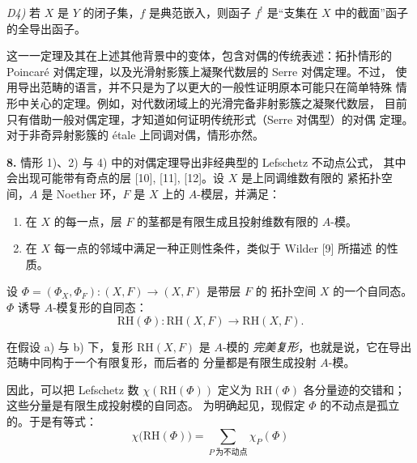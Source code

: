\clearpage
{}
\noindent\textit{D4)} 若 $X$ 是 $Y$ 的闭子集，$f$ 是典范嵌入，则函子
$f^!$ 是“支集在 $X$ 中的截面”函子的全导出函子。

这一一定理及其在上述其他背景中的变体，包含对偶的传统表述：拓扑情形的
Poincaré 对偶定理，以及光滑射影簇上凝聚代数层的 Serre 对偶定理。不过，
使用导出范畴的语言，并不只是为了以更大的一般性证明原本可能只在简单特殊
情形中关心的定理。例如，对代数闭域上的光滑完备非射影簇之凝聚代数层，
目前只有借助一般对偶定理，才知道如何证明传统形式（Serre 对偶型）的对偶
定理。对于非奇异射影簇的 étale 上同调对偶，情形亦然。

\noindent\textbf{8.}\quad
情形 1)、2) 与 4) 中的对偶定理导出非经典型的 Lefschetz 不动点公式，
其中会出现可能带有奇点的层 [10], [11], [12]。设 $X$ 是上同调维数有限的
紧拓扑空间，$A$ 是 Noether 环，$F$ 是 $X$ 上的 $A$-模层，并满足：

\begin{enumerate}
\renewcommand{\labelenumi}{\alph{enumi})}
\item 在 $X$ 的每一点，层 $F$ 的茎都是有限生成且投射维数有限的 $A$-模。

\item 在 $X$ 每一点的邻域中满足一种正则性条件，类似于 Wilder [9] 所描述
的性质。
\end{enumerate}

设 $\Phi=(\Phi_X,\Phi_F)\colon(X,F)\longrightarrow(X,F)$ 是带层 $F$ 的
拓扑空间 $X$ 的一个自同态。$\Phi$ 诱导 $A$-模复形的自同态：
\[
\mathrm{RH}(\Phi)\colon
\mathrm{RH}(X,F)\longrightarrow\mathrm{RH}(X,F).
\]

在假设 a) 与 b) 下，复形 $\mathrm{RH}(X,F)$ 是 $A$-模的
\emph{完美复形}，也就是说，它在导出范畴中同构于一个有限复形，而后者的
分量都是有限生成投射 $A$-模。

因此，可以把 Lefschetz 数 $\chi(\mathrm{RH}(\Phi))$ 定义为
$\mathrm{RH}(\Phi)$ 各分量迹的交错和；这些分量是有限生成投射模的自同态。
为明确起见，现假定 $\Phi$ 的不动点是孤立的。于是有等式：
\begingroup
\makeatletter
\tagsleft@true
\let\veqno\@@leqno
\makeatother
\begin{equation}
\chi\bigl(\mathrm{RH}(\Phi)\bigr)
=\sum_{P\ \text{为不动点}}\chi_P(\Phi)
\tag{Lef}
\end{equation}
\endgroup
